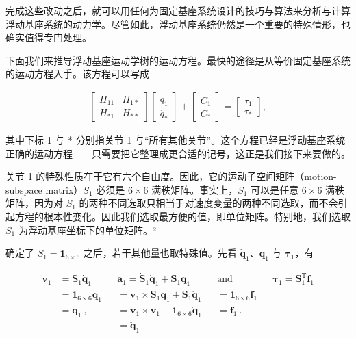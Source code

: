 \documentclass[10pt,a4paper]{book}
\theoremstyle{thmstyle} %
\theoremstyle{defstyle} %
\theoremstyle{prostyle} %
\begin{document}
完成这些改动之后，就可以用任何为固定基座系统设计的技巧与算法来分析与计算浮动基座系统的动力学。尽管如此，浮动基座系统仍然是一个重要的特殊情形，也确实值得专门处理。



下面我们来推导浮动基座运动学树的运动方程。最快的途径是从等价固定基座系统的运动方程入手。该方程可以写成



$$
\begin{array}{r} { \left[ \begin{array}{ll} { H _ { 11 } } & { H _ { 1 * } } \\{ H _ { * 1 } } & { H _ { * * } } \end{array} \right] \left[ \begin{array}{l} { \ddot { q } _ { 1 } } \\{ \ddot { q } _ { * } } \end{array} \right] + \left[ \begin{array}{l} { C _ { 1 } } \\{ C _ { * } } \end{array} \right] = \left[ \begin{array}{l} { \tau _ { 1 } } \\{ \tau _ { * } } \end{array} \right] , } \end{array}
$$



其中下标 1 与 * 分别指关节 1 与“所有其他关节”。这个方程已经是浮动基座系统正确的运动方程——只需要把它整理成更合适的记号，这正是我们接下来要做的。



关节 1 的特殊性质在于它有六个自由度。因此，它的运动子空间矩阵（motion-subspace matrix）$S_1$ 必须是 $6 \times 6$ 满秩矩阵。事实上，$S_1$ 可以是任意 $6 \times 6$ 满秩矩阵，因为对 $S_1$ 的两种不同选取只相当于对速度变量的两种不同选取，而不会引起方程的根本性变化。因此我们选取最方便的值，即单位矩阵。特别地，我们选取 $S_1$ 为浮动基座坐标下的单位矩阵。²



确定了 $S_{1}=\mathbf{1}_{6\times6}$ 之后，若干其他量也取特殊值。先看 $\dot{\mathbf{q}}_{1}$、$\ddot{\mathbf{q}}_{1}$ 与 $\boldsymbol{\tau}_{1}$，有



$$
\begin{aligned}\boldsymbol{v}_{1}&=\boldsymbol{S}_1\dot{\boldsymbol{q}}_1&&\boldsymbol{a}_1=\dot{\boldsymbol{S}}_1\dot{\boldsymbol{q}}_1+\boldsymbol{S}_1\ddot{\boldsymbol{q}}_1&&\mathrm{and}&&\boldsymbol{\tau}_1=\boldsymbol{S}_1^\mathrm{T}\boldsymbol{f}_1\\&=\boldsymbol{1}_{6\times6}\dot{\boldsymbol{q}}_1&&=\boldsymbol{v}_1\times\boldsymbol{S}_1\dot{\boldsymbol{q}}_1+\boldsymbol{S}_1\ddot{\boldsymbol{q}}_1&&=\boldsymbol{1}_{6\times6}\boldsymbol{f}_1\\&=\dot{\boldsymbol{q}}_1\:,&&=\boldsymbol{v}_1\times\boldsymbol{v}_1+\boldsymbol{1}_{6\times6}\ddot{\boldsymbol{q}}_1&&=\boldsymbol{f}_1\:.\\&&&=\ddot{\boldsymbol{q}}_1\end{aligned}
$$
\end{document}
